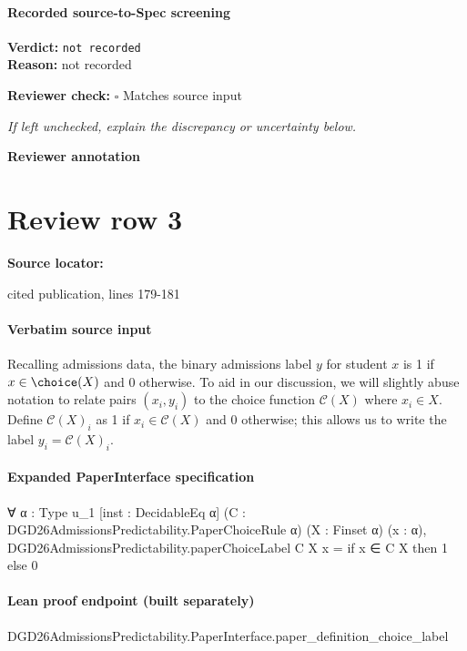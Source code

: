 \documentclass[10pt]{article}
\newcommand{\reviewerbox}{%
  \par\noindent\fbox{\parbox{0.96\linewidth}{\rule{0pt}{0.38in}}}\par
}
\newcommand{\reviewmatch}[1]{%
  \par\noindent\textbf{Reviewer check:} $\square$\; #1\par
  \noindent\emph{If left unchecked, explain the discrepancy or uncertainty below.}\par
}
\begin{document}
\paragraph{Recorded source-to-Spec screening}
\textbf{Verdict:} \texttt{not recorded}
\\
\textbf{Reason:} not recorded
\reviewmatch{Matches source input}
\noindent\textbf{Reviewer annotation}\par
\reviewerbox
\clearpage
\hypertarget{source-claim-d396bf72ee1812a2}{}
\section*{Review row 3}
\textbf{Source locator:} {\footnotesize\raggedright cited publication, lines 179-\allowbreak{}181\par}
\paragraph{Verbatim source input}
\begin{ReviewVerbatim}
Recalling admissions data, the binary admissions label $y$ for student $x$ is 1 if $x \in \choice(X)$ and 0 otherwise.
To aid in our discussion, we will slightly abuse notation to relate pairs $(x_i,y_i)$ to the choice function $\mathcal C(X)$ where $x_i\in X$.
Define $\mathcal C(X)_i$ as 1 if $x_i\in \mathcal C(X)$ and 0 otherwise; this allows us to write the label $y_i=\mathcal C(X)_i$.
\end{ReviewVerbatim}


\paragraph{Expanded PaperInterface specification}
\begin{ReviewVerbatim}
∀ {α : Type u_1} [inst : DecidableEq α] (C : DGD26AdmissionsPredictability.PaperChoiceRule α) (X : Finset α) (x : α),
  DGD26AdmissionsPredictability.paperChoiceLabel C X x = if x ∈ C X then 1 else 0
\end{ReviewVerbatim}

\paragraph{Lean proof endpoint (built separately)}\begin{ReviewVerbatim}
DGD26AdmissionsPredictability.PaperInterface.paper_definition_choice_label
\end{ReviewVerbatim}
\end{document}
